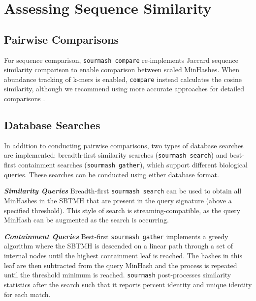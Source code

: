 \documentclass[10pt,a4paper,twocolumn]{article}
\begin{document}

\section*{Assessing Sequence Similarity}

\subsection*{Pairwise Comparisons}

For sequence comparison, \lstinline{sourmash compare} re-implements Jaccard sequence similarity comparison to enable comparison between scaled MinHashes. When abundance tracking of k-mers is enabled, \lstinline{compare} instead calculates the cosine similarity, although we recommend using more accurate approaches for detailed comparisons \cite{rowe2019streaming}.

\subsection*{Database Searches}
In addition to conducting pairwise comparisons, two types of database searches are implemented: breadth-first similarity searches (\lstinline{sourmash search}) and best-first containment searches (\lstinline{sourmash gather}), which support different biological queries. These searches con be conducted using either database format. 

\textit{\textbf{Similarity Queries}} Breadth-first \lstinline{sourmash search} can be used to obtain all MinHashes in the SBTMH that are present in the query signature (above a specified threshold). This style of search is streaming-compatible, as the query MinHash can be augmented as the search is occurring.

\textit{\textbf{Containment Queries}}
 Best-first \lstinline{sourmash gather} implements a greedy algorithm where the SBTMH is descended on a linear path through a set of internal nodes until the highest containment leaf is reached. The hashes in this leaf are then subtracted from the query MinHash and the process is repeated until the threshold minimum is reached. \lstinline{sourmash} post-processes similarity statistics after the search such that it reports percent identity and unique identity for each match.
\end{document}
